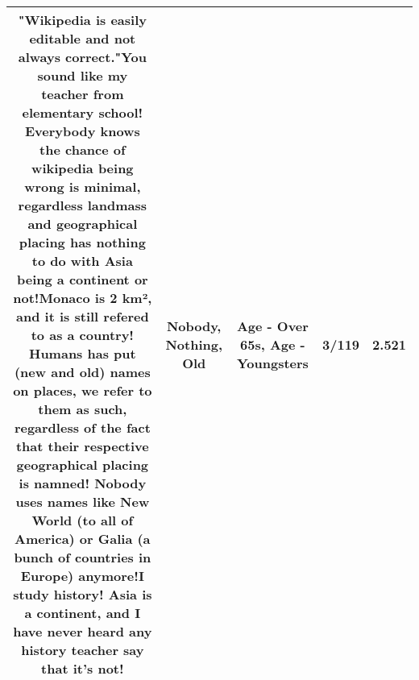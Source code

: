 \documentclass[11pt]{article}
\newlength\mylength
\begin{document}
\begin{center}
\begin{longtable}{|C{.65\mylength}|C{.30\mylength}|C{.12\mylength}|C{.12\mylength}|C{.12\mylength}|}
  \small "Wikipedia is easily editable and not always correct."You sound like my teacher from elementary school! Everybody knows the chance of wikipedia being wrong is minimal, regardless landmass and geographical placing has \textbf{nothing} to do with Asia being a continent or not!Monaco is 2 km², and it is still refered to as a country! Humans has put (new and \textbf{old}) names on places, we refer to them as such, regardless of the fact that their respective geographical placing is namned! \textbf{Nobody} uses names like New World (to all of America) or Galia (a bunch of countries in Europe) anymore!I study history! Asia is a continent, and I have never heard any history teacher say that it's not!\normalsize   & Nobody, Nothing, Old & Age - Over 65s, Age - Youngsters & 3/119 & 2.521 \\  \hline
  
\end{longtable}
\end{center}
\end{document}
